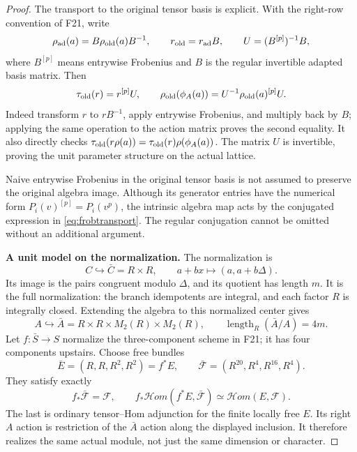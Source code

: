 \documentclass[11pt,a4paper]{article}
\newcommand{\fid}[1]{\textsf{#1}}\newcommand{\gate}[1]{\textsf{#1}}
\theoremstyle{named}\newtheorem{finding}{Finding}[section]
\theoremstyle{definition}\newtheorem{definition}[finding]{Definition}
\theoremstyle{remark}\newtheorem{remark}[finding]{Remark}
\begin{document}
\begin{proof}
The transport to the original tensor basis is explicit. With the
right-row convention of \fid{F21}, write
\[
 \rho_{\rm ad}(a)=B\rho_{\rm old}(a)B^{-1},\qquad
 r_{\rm old}=r_{\rm ad}B,\qquad
 U=(B^{[p]})^{-1}B,
\]
where $B^{[p]}$ means entrywise Frobenius and $B$ is the regular
invertible adapted basis matrix. Then
\begin{equation}\label{eq:frobtransport}
 \tau_{\rm old}(r)=r^{[p]}U,\qquad
 \rho_{\rm old}(\phi_A(a))
       =U^{-1}\rho_{\rm old}(a)^{[p]}U.
\end{equation}
Indeed transform $r$ to $rB^{-1}$, apply entrywise Frobenius,
and multiply back by $B$; applying the same operation to the
action matrix proves the second equality. It also directly checks
$\tau_{\rm old}(r\rho(a))=\tau_{\rm old}(r)\rho(\phi_A(a))$.
The matrix $U$ is invertible, proving the unit parameter structure
on the actual lattice.

Naive entrywise Frobenius in the original tensor basis is not
assumed to preserve the original algebra image. Although its
generator entries have the numerical form $P_i(v)^{[p]}=P_i(v^p)$,
the intrinsic algebra map acts by the conjugated expression in
\eqref{eq:frobtransport}. The regular conjugation cannot be omitted
without an additional argument.

\par\smallskip\noindent\textbf{A unit model on the normalization.}\quad
The normalization is
\[
 C\hookrightarrow\bar C=R\times R,
 \qquad a+bx\longmapsto(a,a+b\Delta).
\]
Its image is the pairs congruent modulo $\Delta$, and its quotient
has length $m$. It is the full normalization: the branch idempotents
are integral, and each factor $R$ is integrally closed.
Extending the algebra to this normalized center gives
\[
 A\hookrightarrow\bar A
       =R\times R\times M_2(R)\times M_2(R),
 \qquad \operatorname{length}_R(\bar A/A)=4m.
\]
Let $f:\bar S\to S$ normalize the three-component scheme in
\fid{F21}; it has four components upstairs. Choose free bundles
\[
 \bar E=(R,R,R^2,R^2)=f^*E,\qquad
 \bar{\mathcal F}=(R^{20},R^4,R^{16},R^4).
\]
They satisfy exactly
\[
 f_*\bar{\mathcal F}=\mathcal F,\qquad
 f_*\mathcal Hom(f^*E,\bar{\mathcal F})
       \simeq\mathcal Hom(E,\mathcal F).
\]
The last is ordinary tensor--Hom adjunction for the finite locally
free $E$. Its right $A$ action is restriction of the $\bar A$
action along the displayed inclusion. It therefore realizes the
same actual module, not just the same dimension or character.


\end{proof}
\end{document}
